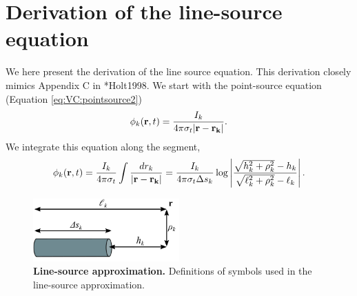 \chapter{Derivation of the line-source equation}
\label{app:linesource}
We here present the derivation of the line source equation.
This derivation closely mimics Appendix C in \citeasnoun**{Holt1998}.
We start with the point-source equation (Equation \ref{eq:VC:pointsource2})
\begin{equation}
\phi_k({\bf r}, t) = \frac{I_k}{4\pi \sigma_t |{\bf r-r_k}|}.
\end{equation}
We integrate this equation along the segment,
\begin{equation}
\phi_k({\bf r},t) = \frac{I_k}{4\pi \sigma_t} \int \frac{dr_k}{|{\bf r-r_k}|} = 
\frac{I_k}{4\pi \sigma_t \Delta s_k} \log \left| \frac{\sqrt{h_k^2+\rho_k^2}-h_k}{\sqrt{\ell_k^2+\rho_k^2}-\ell_k} \right|.
\end{equation}
\begin{figure}[!ht]
\begin{center}
\includegraphics[width=0.5\textwidth]{Figures/VC/line_source_illustration.png}
\end{center}
\caption[]{\textbf{Line-source approximation.} Definitions of symbols used in the line-source approximation. }
\label{App:fig:line_source_illustration}
\end{figure}
